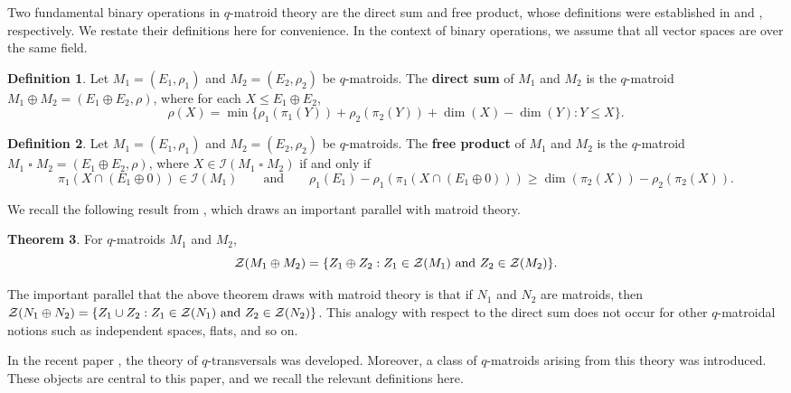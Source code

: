 \documentclass{article}
\theoremstyle{definition}
\newtheorem{theorem}{Theorem}[section]
\newtheorem{definition}[theorem]{{{Definition}}}
\newcommand{\sq}{\mathbin{\square}}
\begin{document}
Two fundamental binary operations in $q$-matroid theory are the direct sum and free product, whose definitions were established in \cite{CeriaJurrius2024DirectSum} and \cite{AlfaranoByrneFulcher2025}, respectively. We restate their definitions here for convenience. In the context of binary operations, we assume that all vector spaces are over the same field.

\begin{definition}\label{def:direct_sum}\cite[Definition 38, Theorem 45]{CeriaJurrius2024DirectSum}
    Let $M_1=(E_1,\rho_1)$ and $M_2=(E_2,\rho_2)$ be $q$-matroids. The \textbf{direct sum} of $M_1$ and $M_2$ is the $q$-matroid $M_1\oplus M_2=(E_1\oplus E_2,\rho)$, where for each $X\leq E_1\oplus E_2$,
    $$\rho(X)=\min\{\rho_1(\pi_1(Y))+\rho_2(\pi_2(Y))+\dim(X)-\dim(Y):Y\leq X\}.$$
\end{definition}

\begin{definition}\label{def:free_product}\cite[Definition 20]{AlfaranoByrneFulcher2025}
    Let $M_1=(E_1,\rho_1)$ and $M_2=(E_2,\rho_2)$ be $q$-matroids. The \textbf{free product} of $M_1$ and $M_2$ is the $q$-matroid $M_1\sq M_2=(E_1\oplus E_2,\rho)$, where $X\in\mathcal{I}(M_1\sq M_2)$ if and only if
    $$\pi_1(X\cap(E_1\oplus0))\in\mathcal{I}(M_1)\qquad\text{and}\qquad
    \rho_1(E_1)-\rho_1(\pi_1(X\cap(E_1\oplus0)))\geq \dim(\pi_2(X))-\rho_2(\pi_2(X)).$$
\end{definition}

We recall the following result from \cite{GluesingLuerssenJany2024}, which draws an important parallel with matroid theory.

\begin{theorem}\label{thm:direct_sum_cyclic_flats}\cite[Theorem 6.2]{GluesingLuerssenJany2024}
    For $q$-matroids $M_1$ and $M_2$,
    $$\mathcal{Z}(M_1\oplus M_2)=\{Z_1\oplus Z_2:Z_1\in\mathcal{Z}(M_1)\textup{ and }Z_2\in\mathcal{Z}(M_2)\}.$$
\end{theorem}

The important parallel that the above theorem draws with matroid theory is that if $N_1$ and $N_2$ are matroids, then $\mathcal{Z}(N_1\oplus N_2)=\{Z_1\cup Z_2:Z_1\in\mathcal{Z}(N_1)\textup{ and }Z_2\in\mathcal{Z}(N_2)\}$. This analogy with respect to the direct sum does not occur for other $q$-matroidal notions such as independent spaces, flats, and so on.

In the recent paper \cite{saaltink2025theoryqtransversals}, the theory of $q$-transversals was developed. Moreover, a class of $q$-matroids arising from this theory was introduced. These objects are central to this paper, and we recall the relevant definitions here.
\end{document}
